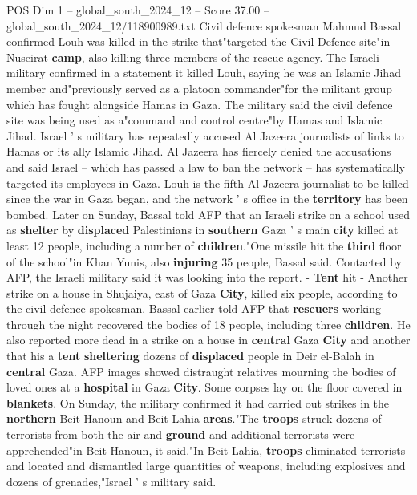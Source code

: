 \begin{textsample}{POS Dim 1 – global\_south\_2024\_12 – Score 37.00 – global\_south\_2024\_12/118900989.txt}  \label{ex:f1_pos_102}
Civil defence spokesman Mahmud Bassal confirmed Louh was killed in the strike that"targeted the Civil Defence site"in Nuseirat \textbf{camp}, also killing three members of the rescue agency.
The Israeli military confirmed in a statement it killed Louh, saying he was an Islamic Jihad member and"previously served as a platoon commander"for the militant group which has fought alongside Hamas in Gaza.
The military said the civil defence site was being used as a"command and control centre"by Hamas and Islamic Jihad.
Israel ' s military has repeatedly accused Al Jazeera journalists of links to Hamas or its ally Islamic Jihad.
Al Jazeera has fiercely denied the accusations and said Israel -- which has passed a law to ban the network -- has systematically targeted its employees in Gaza.
Louh is the fifth Al Jazeera journalist to be killed since the war in Gaza began, and the network ' s office in the \textbf{territory} has been bombed.
Later on Sunday, Bassal told AFP that an Israeli strike on a school used as \textbf{shelter} by \textbf{displaced} Palestinians in \textbf{southern} Gaza ' s main \textbf{city} killed at least 12 people, including a number of \textbf{children}."One missile hit the \textbf{third} floor of the school"in Khan Yunis, also \textbf{injuring} 35 people, Bassal said.
Contacted by AFP, the Israeli military said it was looking into the report. - \textbf{Tent} hit - Another strike on a house in Shujaiya, east of Gaza \textbf{City}, killed six people, according to the civil defence spokesman.
Bassal earlier told AFP that \textbf{rescuers} working through the night recovered the bodies of 18 people, including three \textbf{children}.
He also reported more dead in a strike on a house in \textbf{central} Gaza \textbf{City} and another that his a \textbf{tent} \textbf{sheltering} dozens of \textbf{displaced} people in Deir el-Balah in \textbf{central} Gaza.
AFP images showed distraught relatives mourning the bodies of loved ones at a \textbf{hospital} in Gaza \textbf{City}.
Some corpses lay on the floor covered in \textbf{blankets}.
On Sunday, the military confirmed it had carried out strikes in the \textbf{northern} Beit Hanoun and Beit Lahia \textbf{areas}."The \textbf{troops} struck dozens of terrorists from both the air and \textbf{ground} and additional terrorists were apprehended"in Beit Hanoun, it said."In Beit Lahia, \textbf{troops} eliminated terrorists and located and dismantled large quantities of weapons, including explosives and dozens of grenades,"Israel ' s military said.

\end{textsample}
